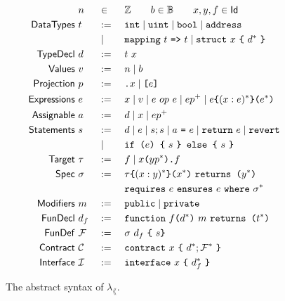 \begin{figure}
  \begin{alignat*}{3}
    &~ n && \in && \mathbb{Z} \qquad b \in \mathbb{B} \qquad x,y,f \in \mathsf{Id}   \\
    \mathsf{Data Types} &~ t && :=\ && \texttt{int} \mid \texttt{uint} \mid \texttt{bool} \mid \texttt{address} \\
                &~   && \mid\ && \texttt{mapping} ~t~ \texttt{=>} ~t \mid \texttt{struct} ~x~ \texttt{\{}~ d^* ~\texttt{\}} \\
    \mathsf{Type Decl}    &~ d && :=\ && t ~ x \\
    \mathsf{Values}      &~ v && :=\ && n \mid b \\
    \mathsf{Projection}  &~ p && :=\ && \texttt{.}x \mid \texttt{[}e\texttt{]} \\
    \mathsf{Expressions} &~ e && :=\ && x \mid v \mid e ~op~ e \mid e p^+ \mid {e}\texttt{\{}{(x: e)^*}\texttt{\}(}{e^*}\texttt{)} \\
    \mathsf{Assignable}  &~ a && :=\ && d \mid x \mid e p^+ \\
    \mathsf{Statements}  &~ s && :=\ && d \mid e \mid s; s \mid a ~\texttt{=}~ e \mid \texttt{return}~ e \mid \texttt{revert} \\
                      &~   && \mid\ && \texttt{if (}e\texttt{) \{}~ s ~\texttt{\} else \{}~ s ~\texttt{\}} \\
    \mathsf{Target}      &~ \tau && :=\ && f \mid x \texttt{(} y p^* \texttt{).}f \\
    \mathsf{Spec}        &~ \sigma && :=\ && {\tau}\texttt{\{}{(x : y)^*}\texttt{\}(}{x^*}\texttt{)} ~\texttt{returns (}{y^*}\texttt{)} \\
                      &~        &&     && \texttt{requires}~ {e} ~\texttt{ensures}~ {e} ~\texttt{where}~ {\sigma^*} \\
    \mathsf{Modifiers}   &~ m && :=\ && \texttt{public} \mid \texttt{private} \\
    \mathsf{Fun Decl}    &~ d_f && :=\ && \texttt{function}~ {f}\texttt{(}{d^*}\texttt{)} ~ {m} ~\texttt{returns (}{t^*}\texttt{)} \\
    \mathsf{Fun Def}     &~ \mathcal{F}&& :=\ && \sigma ~ d_f ~ \texttt{\{} ~ s \texttt{\}} \\
    \mathsf{Contract}    &~ \mathcal{C}&& :=\ && \texttt{contract}~ {x}~ \texttt{\{}~ {d^*}; {\mathcal{F}^*} ~\texttt{\}} \\
    \mathsf{Interface}   &~ \mathcal{I}&& :=\ && \texttt{interface}~ {x}~ \texttt{\{}~ {d_f^*} ~\texttt{\}}
  \end{alignat*}
  \caption{The abstract syntax of $\lambda_\lang$.}
  \label{fig:syntax}
\end{figure}

\iffalse

